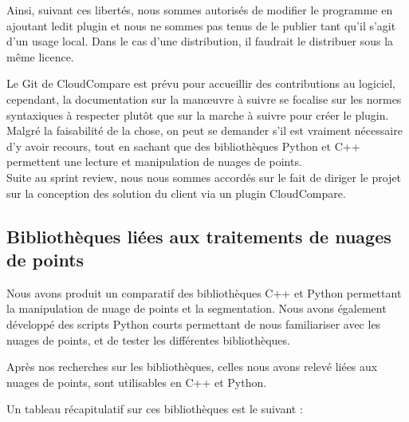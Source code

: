 \documentclass[12pt,titlepage,french]{article}
\begin{document}
Ainsi, suivant ces libertés, nous sommes autorisés de modifier le programme en ajoutant ledit plugin et nous ne sommes pas tenus de le publier tant qu'il s'agit d'un usage local. Dans le cas d'une distribution, il faudrait le distribuer sous la même licence.

Le Git de CloudCompare est prévu pour accueillir des contributions au logiciel, cependant, la documentation sur la manœuvre à suivre se focalise sur les normes syntaxiques à respecter plutôt que sur la marche à suivre pour créer le plugin.
Malgré la faisabilité de la chose, on peut se demander s'il est vraiment nécessaire d'y avoir recours, tout en sachant que des bibliothèques Python et C++ permettent une lecture et manipulation de nuages de points.\\
Suite au sprint review, nous nous sommes accordés sur le fait de diriger le projet sur la conception des solution du client via un plugin CloudCompare.


\subsection{Bibliothèques liées aux traitements de nuages de points}

Nous avons produit un comparatif des bibliothèques C++ et Python permettant la manipulation de nuage de points et la segmentation.
Nous avons également développé des scripts Python courts permettant de nous familiariser avec les nuages de points, et de tester les différentes bibliothèques.

Après nos recherches sur les bibliothèques, celles nous avons relevé liées aux nuages de points, sont utilisables en C++ et Python.

Un tableau récapitulatif sur ces bibliothèques est le suivant : \\
\end{document}
